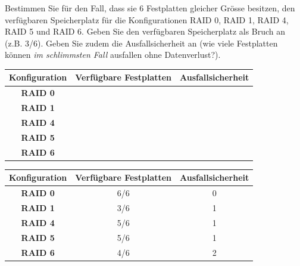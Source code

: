 \begin{myexercise}
    Bestimmen Sie für den Fall, dass sie 6 Festplatten gleicher Grösse besitzen, den verfügbaren Speicherplatz für die Konfigurationen RAID 0, RAID 1, RAID 4, RAID 5 und RAID 6. Geben Sie den verfügbaren Speicherplatz als Bruch an (z.B. 3/6). Geben Sie zudem die Ausfallsicherheit an (wie viele Festplatten können \textit{im schlimmsten Fall} ausfallen ohne Datenverlust?).
    
    \begin{table}[H]
        \centering
        \begin{tabular}{c||c|c}
            \textbf{Konfiguration} & \textbf{Verfügbare Festplatten} & \textbf{Ausfallsicherheit} \\\midrule\midrule
            \textbf{RAID 0}        &                                 &                            \\[1cm]\midrule
            \textbf{RAID 1}        &                                 &                            \\[1cm]\midrule
            \textbf{RAID 4}        &                                 &                            \\[1cm]\midrule
            \textbf{RAID 5}        &                                 &                            \\[1cm]\midrule
            \textbf{RAID 6}        &                                 &                            \\[1cm]
        \end{tabular}
    \end{table}
    \begin{myanswer}
        \begin{table}[H]
            \centering
            \begin{tabular}{c||c|c}
                \textbf{Konfiguration} & \textbf{Verfügbare Festplatten} & \textbf{Ausfallsicherheit} \\\midrule\midrule
                \textbf{RAID 0}        & 6/6                             & 0                          \\\midrule
                \textbf{RAID 1}        & 3/6                             & 1                          \\\midrule
                \textbf{RAID 4}        & 5/6                             & 1                          \\\midrule
                \textbf{RAID 5}        & 5/6                             & 1                          \\\midrule
                \textbf{RAID 6}        & 4/6                             & 2                          \\
            \end{tabular}
        \end{table}
    \end{myanswer}
\end{myexercise}


